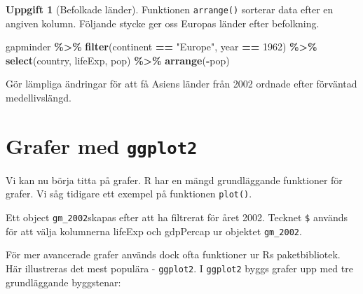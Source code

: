 \documentclass[
]{book}
\newenvironment{Shaded}{\begin{snugshade}}{\end{snugshade}}
\newcommand{\DecValTok}[1]{\textcolor[rgb]{0.00,0.00,0.81}{#1}}
\newcommand{\FunctionTok}[1]{\textcolor[rgb]{0.13,0.29,0.53}{\textbf{#1}}}
\newcommand{\NormalTok}[1]{#1}
\newcommand{\OtherTok}[1]{\textcolor[rgb]{0.56,0.35,0.01}{#1}}
\newcommand{\SpecialCharTok}[1]{\textcolor[rgb]{0.81,0.36,0.00}{\textbf{#1}}}
\newcommand{\StringTok}[1]{\textcolor[rgb]{0.31,0.60,0.02}{#1}}
\theoremstyle{definition}
\theoremstyle{definition}
\theoremstyle{definition}
\newtheorem{exercise}{Uppgift}[chapter]
\theoremstyle{definition}
\theoremstyle{remark}
\begin{document}
\begin{exercise}[Befolkade länder]
Funktionen \texttt{arrange()} sorterar data efter en angiven kolumn. Följande stycke ger oss Europas länder efter befolkning.

\begin{Shaded}
\begin{Highlighting}[]
\NormalTok{gapminder }\SpecialCharTok{\%\textgreater{}\%}                                    
  \FunctionTok{filter}\NormalTok{(continent }\SpecialCharTok{==} \StringTok{"Europe"}\NormalTok{, year }\SpecialCharTok{==} \DecValTok{1962}\NormalTok{) }\SpecialCharTok{\%\textgreater{}\%}
  \FunctionTok{select}\NormalTok{(country, lifeExp, pop) }\SpecialCharTok{\%\textgreater{}\%}
  \FunctionTok{arrange}\NormalTok{(}\SpecialCharTok{{-}}\NormalTok{pop)                                   }
\end{Highlighting}
\end{Shaded}

Gör lämpliga ändringar för att få Asiens länder från 2002 ordnade efter förväntad medellivslängd.
\end{exercise}

\section{\texorpdfstring{Grafer med \texttt{ggplot2}}{Grafer med ggplot2}}\label{grafer-med-ggplot2}

Vi kan nu börja titta på grafer. R har en mängd grundläggande funktioner för grafer. Vi såg tidigare ett exempel på funktionen \texttt{plot()}.

\begin{Shaded}
\end{Shaded}

Ett object \texttt{gm\_2002}skapas efter att ha filtrerat för året 2002. Tecknet \texttt{\$} används för att välja kolumnerna lifeExp och gdpPercap ur objektet \texttt{gm\_2002}.

För mer avancerade grafer används dock ofta funktioner ur Rs paketbibliotek. Här illustreras det mest populära - \texttt{ggplot2}. I \texttt{ggplot2} byggs grafer upp med tre grundläggande byggstenar:
\end{document}
